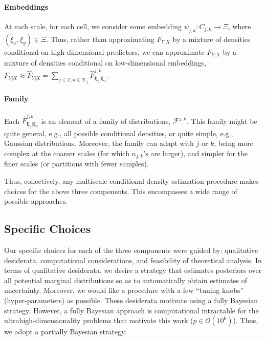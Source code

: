 \documentclass{article} %
\providecommand{\mh}[1]{\hat{#1}}
\providecommand{\mb}[1]{\boldsymbol{#1}}
\providecommand{\mc}[1]{\mathcal{#1}}
\newcommand{\from}{{\ensuremath{\colon}}}  %
\newcommand{\ZZ}{\mathbb{Z}}
\begin{document}
\paragraph{Embeddings}
At each scale, for each cell, we consider some embedding $\psi_{j,k} \from C_{j,k} \to \Xi$, where $(\xi_x,\xi_y) \in \Xi$.  Thus, rather than approximating $F_{Y|X}$ by a mixture of densities conditional on high-dimensional predictors, we can approximate $F_{Y|X}$ by a mixture of densities conditional on low-dimensional embeddings,  $F_{Y|X} \approx \mh{F}_{Y|X} = \sum_{j \in \ZZ, k \in \mc{K}_j} \mh{F}^{j,k}_{\mb{\xi}_y| \mb{\xi}_x}$.   

\paragraph{Family} Each $\mh{F}^{j,k}_{\mb{\xi}_y | \mb{\xi}_x}$ is an element of a family of distributions, $\mc{F}^{j,k}$.  This family might be quite general, e.g., all possible conditional densities, or quite simple, e.g., Gaussian distributions.  Moreover, the family can adapt with $j$ or $k$, being more complex at the coarser scales (for which $n_{j,k}$'s are larger), and simpler for the finer scales (or partitions with fewer samples).


Thus, collectively, any multiscale conditional density estimation procedure makes choices for the above three components.  This encompasses a wide range of possible approaches. 



\subsection{Specific Choices} \label{sub:spec}

Our specific choices for each of the three components were guided by: qualitative desiderata, computational considerations, and feasibility of theoretical analysis.  In terms of qualitative desiderata, we desire a strategy that estimates posteriors over all potential marginal distributions so as to automatically obtain estimates of uncertainty.  Moreover, we would like a procedure with a few ``tuning knobs'' (hyper-parameters) as possible.  These desiderata motivate using a fully Bayesian strategy.  
However, a fully Bayesian approach is computational intractable for the ultrahigh-dimensionality problems that motivate this work ($ p \in \mc{O}(10^6)$).  Thus, we adopt a partially Bayesian strategy.  
\end{document}

